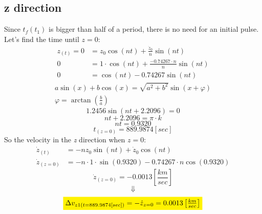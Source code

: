 \documentclass[11pt, a4paper]{article}
\begin{document}
\subsection{z direction}
Since $t_f (t_1)$ is bigger than half of a period, there is no need for an initial pulse. Let's find the time until $z = 0$:
\begin{align}
    \displaystyle z_{(t)} = 0 &= z_0\cos(nt)+\frac{\dot{z}_0}{n}\sin(nt) \\
    0 &= 1\cdot\cos(nt)+\frac{-0.74267\cdot n}{n}\sin(nt) \\
    0 &= \cos(nt) -0.74267\sin(nt)
\end{align}
\begin{equation*}
    \begin{matrix}
        a\sin(x) +b\cos(x) = \displaystyle\sqrt{a^2+b^2}\sin(x+\varphi) \\
        \varphi = \displaystyle\arctan\left(\frac{b}{a}\right)
    \end{matrix}
\end{equation*}
\begin{equation}
    1.2456\sin(nt+2.2096) = 0 
\end{equation}
\begin{equation}
    nt+2.2096 = \pi\cdot k
\end{equation}
\begin{equation}
    nt = 0.9320
\end{equation}
\begin{equation}
    t_{(z=0)} = 889.9874[sec]
\end{equation}
So the velocity in the \emph{z} direction when $z=0$:
\begin{align}
    \dot{z}_{(t)} &= -nz_0\sin(nt)+\dot{z}_0\cos(nt) \\
    \dot{z}_{(z=0)} &= -n\cdot1\cdot\sin(0.9320)-0.74267\cdot n\cos(0.9320) 
\end{align}
\begin{equation*}
    \displaystyle\dot{z}_{(z=0)} = -0.0013\left[\frac{km}{sec}\right]
\end{equation*}
\begin{equation*}
    \Downarrow
\end{equation*}
\begin{equation*}
    \colorbox{yellow}{$\Delta v_{z1(t=889.9874[sec])} = -\dot{z}_{z=0} = 0.0013\left[\frac{km}{sec}\right]$}
\end{equation*}
\end{document}

